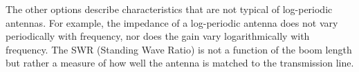 The other options describe characteristics that are not typical of log-periodic antennas. For example, the impedance of a log-periodic antenna does not vary periodically with frequency, nor does the gain vary logarithmically with frequency. The SWR (Standing Wave Ratio) is not a function of the boom length but rather a measure of how well the antenna is matched to the transmission line.

